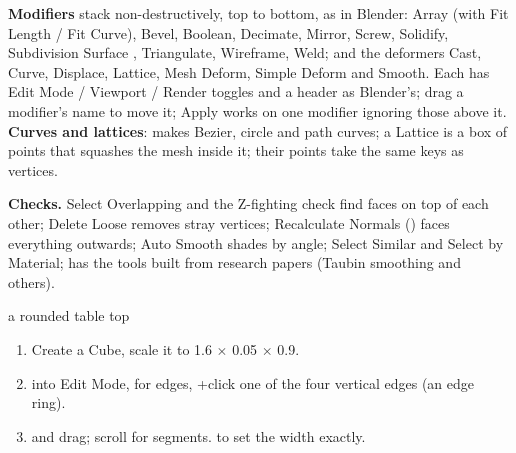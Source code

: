\textbf{Modifiers} stack non-destructively, top to bottom, as in Blender: Array (with Fit Length / Fit Curve), Bevel,
Boolean, Decimate, Mirror, Screw, Solidify, Subdivision Surface \cite{Catmull1978Recursively}, Triangulate,
Wireframe, Weld; and the deformers Cast, Curve, Displace, Lattice, Mesh Deform, Simple Deform and Smooth. Each has
Edit Mode / Viewport / Render toggles and a header as Blender's; drag a modifier's name to move it; Apply works on one
modifier ignoring those above it. \textbf{Curves and lattices}:  makes Bezier, circle and path
curves; a Lattice is a box of points that squashes the mesh inside it; their points take the same keys as vertices.

\textbf{Checks.} Select Overlapping and the Z-fighting check find faces on top of each other; Delete Loose removes stray
vertices; Recalculate Normals () faces everything outwards; Auto Smooth shades by angle; Select Similar
and Select by Material;  has the tools built from research papers (Taubin smoothing
\cite{Taubin1995Signal} and others).

\begin{example}{a rounded table top}
\begin{enumerate}
  \item Create a Cube, scale it to 1.6 $\times$ 0.05 $\times$ 0.9.
  \item {} into Edit Mode,  for edges, +click one of the four vertical edges (an edge ring).
  \item {} and drag; scroll for segments.  to set the width exactly.
\end{enumerate}
\end{example}

